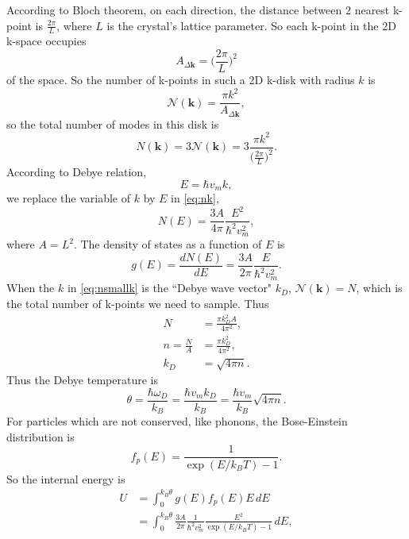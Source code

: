\documentclass[12pt]{article}
\begin{document}
According to Bloch theorem, on each direction, the distance between $2$ nearest k-point is $\frac{ 2 \pi }{ L }$,
where $L$ is the crystal's lattice parameter. So each k-point in the 2D k-space occupies
\begin{equation}
	A_{\Delta \bm{k}} = \Big( \frac{ 2 \pi }{ L } \Big)^2
\end{equation}
of the space. So the number of k-points in such a 2D k-disk with radius $k$ is
\begin{equation}\label{eq:nsmallk}
	\mathcal{N}(\mathbf{ k }) = \frac{ \pi k^2 }{ A_{\Delta \bm{k}} },
\end{equation}
so the total number of modes in this disk is
\begin{equation}\label{eq:nk}
	N(\bm{k}) = 3 \mathcal{N}(\bm{k}) = 3 \frac{ \pi k^2 }{ \Big( \frac{ 2 \pi }{ L } \Big)^2 }.
\end{equation}
According to Debye relation,
\begin{equation}
	E = \hbar v_m k,
\end{equation}
we replace the variable of $k$ by $E$ in \eqref{eq:nk},
\begin{equation}
	N(E) = \frac{ 3 A }{ 4 \pi } \frac{ E^2 }{ \hbar^2 v_m^2 },
\end{equation}
where $A = L^2$.
The density of states as a function of $E$ is
\begin{equation}
	g(E) = \frac{ dN(E) }{ dE } = \frac{ 3 A }{ 2 \pi } \frac{ E }{ \hbar^2 v_m^2 }.
\end{equation}
When the $k$ in \eqref{eq:nsmallk} is the ``Debye wave vector" $k_D$, $\mathcal{N}(\bm{k}) = N$, which
is the total number of k-points we need to sample.
Thus
\begin{align}
	N                   & = \frac{ \pi k_D^2 A }{ 4 \pi^2 }, \\
	n = \frac{ N }{ A } & = \frac{ \pi k_D^2 }{ 4 \pi^2 },   \\
	k_D                 & = \sqrt{4 \pi n}.
\end{align}
Thus the Debye temperature is
\begin{equation}
	\theta = \frac{ \hbar \omega_D }{ k_B } = \frac{ \hbar v_m k_D }{ k_B } = \frac{ \hbar v_m }{ k_B } \sqrt{4 \pi n}.
\end{equation}
For particles which are not conserved, like phonons, the Bose-Einstein distribution is
\begin{equation}
	f_p(E) = \frac{ 1 }{ \exp(E / k_B T) - 1 }.
\end{equation}
So the internal energy is
\begin{equation}\label{eq:U}
	\begin{split}
		U &= \int_{0}^{k_B \theta} g(E) f_p(E) E \, dE \\
		&= \int_{0}^{k_B \theta} \frac{ 3 A }{ 2 \pi } \frac{ 1 }{ \hbar^2 v_m^2 } \frac{ E^2 }{ \exp(E / k_B T) - 1 } \, dE,
	\end{split}
\end{equation}
\end{document}

